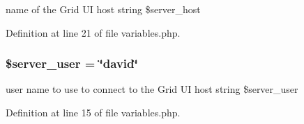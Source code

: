 name of the Grid UI host  string \$server\_\-host 



Definition at line 21 of file variables.php.
\subsubsection{\setlength{\rightskip}{0pt plus 5cm}\$server\_\-user = \char`\"{}david\char`\"{}}\label{variables_8php_a0}


user name to use to connect to the Grid UI host  string \$server\_\-user 



Definition at line 15 of file variables.php.
